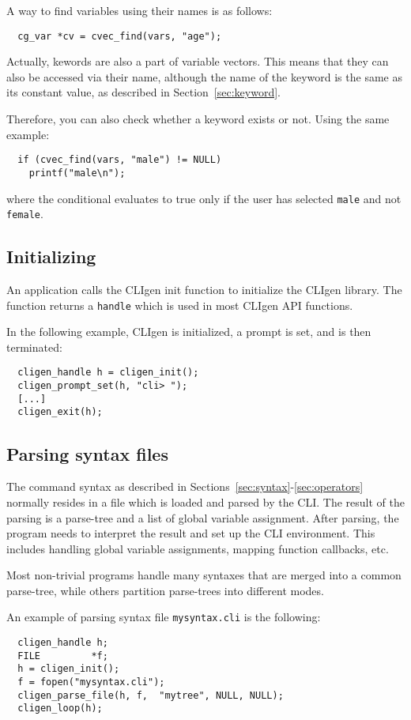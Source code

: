 \documentclass[a4paper, 10pt] {article}
\begin{document}
A way to find variables using their names is as follows:
\begin{verbatim}
  cg_var *cv = cvec_find(vars, "age");
\end{verbatim}

Actually, kewords are also a part of variable vectors. This means that
they can also be accessed via their name, although the name of the
keyword is the same as its constant value, as described in
Section~\ref{sec:keyword}.

Therefore, you can also check whether a keyword exists or not. Using the same example:
\begin{verbatim}
  if (cvec_find(vars, "male") != NULL)
    printf("male\n");
\end{verbatim}
where the conditional evaluates to true only if the user has selected
{\tt male} and not {\tt female}.

\subsection{Initializing}
\label{sec:handle}

An application calls the CLIgen init function to initialize the CLIgen
library.  The function returns a {\tt handle} which is used in most
CLIgen API functions.

In the following example, CLIgen is initialized, a prompt is set, and
is then terminated:
\begin{verbatim}
  cligen_handle h = cligen_init();
  cligen_prompt_set(h, "cli> ");
  [...]
  cligen_exit(h);
\end{verbatim}

\subsection{Parsing syntax files}
\label{sec:parsing}
The command syntax as described in
Sections~\ref{sec:syntax}-\ref{sec:operators} normally resides in a
file which is loaded and parsed by the CLI. The result of the parsing
is a parse-tree and a list of global variable assignment. After
parsing, the program needs to interpret the result and set up the CLI
environment. This includes handling global variable assignments,
mapping function callbacks, etc. 

Most non-trivial programs handle many syntaxes that are merged into a
common parse-tree, while others partition parse-trees into different
modes.

An example of parsing syntax file {\tt mysyntax.cli} is the following: 
\begin{verbatim}
  cligen_handle h;
  FILE         *f;
  h = cligen_init();
  f = fopen("mysyntax.cli");
  cligen_parse_file(h, f,  "mytree", NULL, NULL);
  cligen_loop(h);
\end{verbatim}
\end{document}
